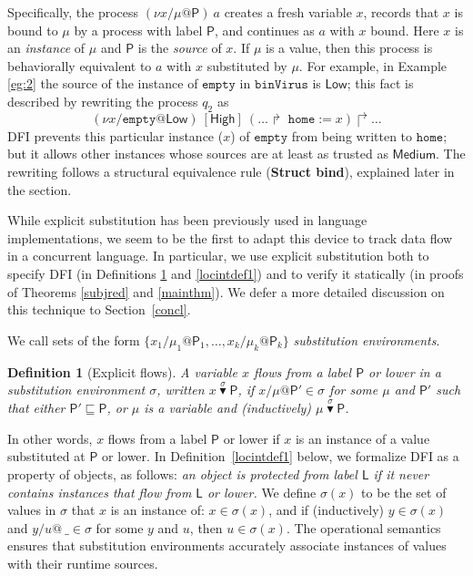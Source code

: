 \documentclass{sigplanconf}
\newcommand{\lab}{\mathsf L}
\newcommand{\labp}{\mathsf P}
\newcommand{\new}[2]{(\nu #1)\:#2}
\newcommand{\srule}[1]{\textbf{Struct #1}}
\newtheorem{definition}{Definition}[section]
\begin{document}
Specifically, the process $\new{x/\mu@\labp}a$ creates a fresh variable $x$, records that $x$ is bound to $\mu$ by a
process with label $\labp$, and continues as $a$ with $x$ bound. Here $x$ is an \emph{instance} of $\mu$ and $\labp$ is the \emph{source} of $x$. If $\mu$ is a value, then this process is behaviorally equivalent to $a$ with $x$ substituted by $\mu$. For example, in Example \ref{eg:2} the source of the instance of $\mathtt{empty}$ in $\mathtt{binVirus}$ is $\mathsf{Low}$; this fact is described by rewriting the process $q_2$ as 
$$\new {x/\mathtt{empty}@\mathsf{Low}} [\mathsf{High}]~(\dots \Rsh~ \mathtt{home}
:= x)  \Rsh \dots$$
DFI prevents this particular instance ($x$) of $\mathtt{empty}$ from being written to $\mathtt{home}$; but it allows other instances whose sources are at least as trusted as $\mathsf{Medium}$. The rewriting follows a structural equivalence rule (\srule{bind}), explained later in the section.

While explicit substitution has been previously used in language implementations, we seem to be the first to adapt this device to track data flow in a concurrent language. In particular, we use explicit substitution both to specify DFI (in Definitions \ref{flowsdef} and \ref{locintdef1}) and to verify it statically (in proofs of Theorems \ref{subjred} and \ref{mainthm}).
We defer a more detailed discussion on this technique to Section~\ref{concl}.


We call sets of the form $\{x_1/\mu_1@\labp_1,\dots,x_k/\mu_k@\labp_k\}$
\emph{substitution environments}. \begin{definition}[Explicit flows]\label{flowsdef} A variable $x$ flows from a label $\labp$ or lower in a substitution environment $\sigma$, written $x \stackrel\sigma\blacktriangledown \labp$, if $x/\mu@\labp' \in \sigma$ for some $\mu$ and $\labp'$ such that either $\labp' \sqsubseteq \labp$, or $\mu$ is a variable and (inductively) $\mu \stackrel\sigma\blacktriangledown  \labp$.
\end{definition}
In other words, $x$ flows from a label $\labp$ or lower if $x$ is an instance of a value substituted at $\labp$ or lower. 
In Definition~\ref{locintdef1} below, we formalize DFI as a property of objects, as follows: \emph{an object is protected from label $\lab$ if it never contains instances that flow from $\lab$ or lower.} 
We define $\sigma(x)$ to be the set of values in $\sigma$ that $x$ is an instance of: $x \in \sigma(x)$, and if (inductively) $y \in \sigma(x)$ and $y/u@~\_ \in \sigma$ for some $y$ and $u$, then $u \in \sigma(x)$. 
The operational semantics ensures that substitution environments accurately associate instances of values with their runtime sources. 
\end{document}
